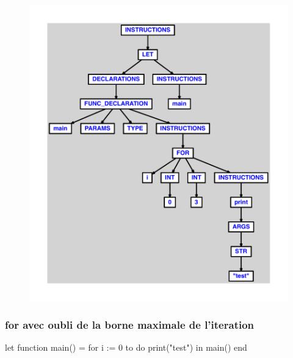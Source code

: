 \documentclass{article}
\begin{document}
\begin{figure}[H]\centering\includegraphics[max width=\textwidth]{ast/ast_189.pdf}\end{figure}\subsubsection{for avec oubli de la borne maximale de l'iteration}
\begin{verbatimtab}
let
	function main() =
		for i := 0 to do
			print("test")
in main() end
\end{verbatimtab}
\end{document}
